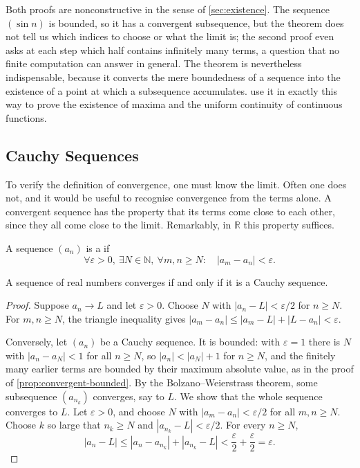 Both proofs are nonconstructive in the sense of \cref{sec:existence}. The sequence $(\sin n)$ is bounded, so it has a convergent subsequence, but the theorem does not tell us which indices to choose or what the limit is; the second proof even asks at each step which half contains infinitely many terms, a question that no finite computation can answer in general. The theorem is nevertheless indispensable, because it converts the mere boundedness of a sequence into the existence of a point at which a subsequence accumulates.  use it in exactly this way to prove the existence of maxima and the uniform continuity of continuous functions.

\subsection{Cauchy Sequences}

To verify the definition of convergence, one must know the limit. Often one does not, and it would be useful to recognise convergence from the terms alone. A convergent sequence has the property that its terms come close to each other, since they all come close to the limit. Remarkably, in $\mathbb R$ this property suffices.

\begin{definition}
\label{def:cauchy}
A sequence $(a_n)$ is a  if
\[
\forall\varepsilon>0,\ \exists N\in\mathbb N,\ \forall m,n\ge N:\quad|a_m-a_n|<\varepsilon .
\]
\end{definition}

\begin{theorem}
\label{thm:cauchy-criterion}
A sequence of real numbers converges if and only if it is a Cauchy sequence.
\end{theorem}

\begin{proof}
Suppose $a_n\to L$ and let $\varepsilon>0$. Choose $N$ with $|a_n-L|<\varepsilon/2$ for $n\ge N$. For $m,n\ge N$, the triangle inequality gives $|a_m-a_n|\le|a_m-L|+|L-a_n|<\varepsilon$.

Conversely, let $(a_n)$ be a Cauchy sequence. It is bounded: with $\varepsilon=1$ there is $N$ with $|a_n-a_N|<1$ for all $n\ge N$, so $|a_n|<|a_N|+1$ for $n\ge N$, and the finitely many earlier terms are bounded by their maximum absolute value, as in the proof of \cref{prop:convergent-bounded}. By the Bolzano--Weierstrass theorem, some subsequence $(a_{n_k})$ converges, say to $L$. We show that the whole sequence converges to $L$. Let $\varepsilon>0$, and choose $N$ with $|a_m-a_n|<\varepsilon/2$ for all $m,n\ge N$. Choose $k$ so large that $n_k\ge N$ and $|a_{n_k}-L|<\varepsilon/2$. For every $n\ge N$,
\[
|a_n-L|\le|a_n-a_{n_k}|+|a_{n_k}-L|<\frac\varepsilon2+\frac\varepsilon2=\varepsilon .
\]
\end{proof}

